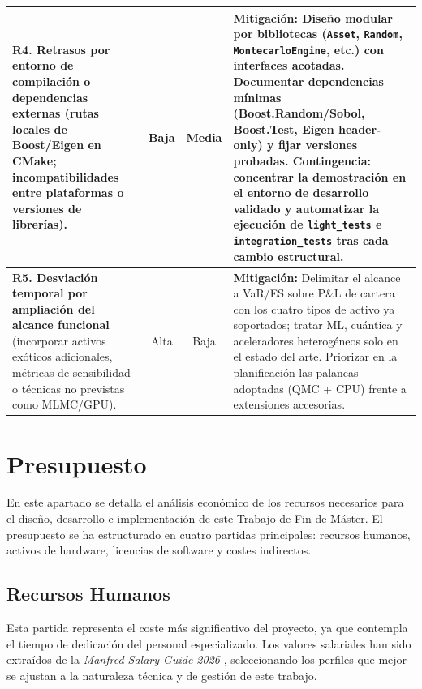 \documentclass[11pt]{article}
\begin{document}
\begin{minipage}{\linewidth}
\begin{tabular}{|p{4.5cm}|c|c|p{7.9cm}|}
\textbf{R4. Retrasos por entorno de compilación o dependencias externas}
(rutas locales de Boost/Eigen en CMake; incompatibilidades entre plataformas o versiones de librerías). &
Baja & Media &
\textbf{Mitigación:} Diseño modular por bibliotecas (\texttt{Asset}, \texttt{Random}, \texttt{MontecarloEngine}, etc.) con interfaces acotadas.
Documentar dependencias mínimas (Boost.Random/Sobol, Boost.Test, Eigen header-only) y fijar versiones probadas.
Contingencia: concentrar la demostración en el entorno de desarrollo validado y automatizar la ejecución de \texttt{light\_tests} e \texttt{integration\_tests} tras cada cambio estructural. \\ \hline

\textbf{R5. Desviación temporal por ampliación del alcance funcional}
(incorporar activos exóticos adicionales, métricas de sensibilidad o técnicas no previstas como MLMC/GPU). &
Alta & Baja &
\textbf{Mitigación:} Delimitar el alcance a VaR/ES sobre P\&L de cartera con los cuatro tipos de activo ya soportados; tratar ML, cuántica y aceleradores heterogéneos solo en el estado del arte.
Priorizar en la planificación las palancas adoptadas (QMC + CPU) frente a extensiones accesorias. \\ \hline

\end{tabular}
\label{tab:riesgos}
\end{minipage}
\vspace{1em}

\section{Presupuesto}
\label{sec:presupuesto}

En este apartado se detalla el análisis económico de los recursos necesarios para el diseño, desarrollo e implementación de este Trabajo de Fin de Máster. El presupuesto se ha estructurado en cuatro partidas principales: recursos humanos, activos de hardware, licencias de software y costes indirectos.

\subsection{Recursos Humanos}

Esta partida representa el coste más significativo del proyecto, ya que contempla el tiempo de dedicación del personal especializado. Los valores salariales han sido extraídos de la \textit{Manfred Salary Guide 2026} \cite{manfred2026}, seleccionando los perfiles que mejor se ajustan a la naturaleza técnica y de gestión de este trabajo.
\end{document}
